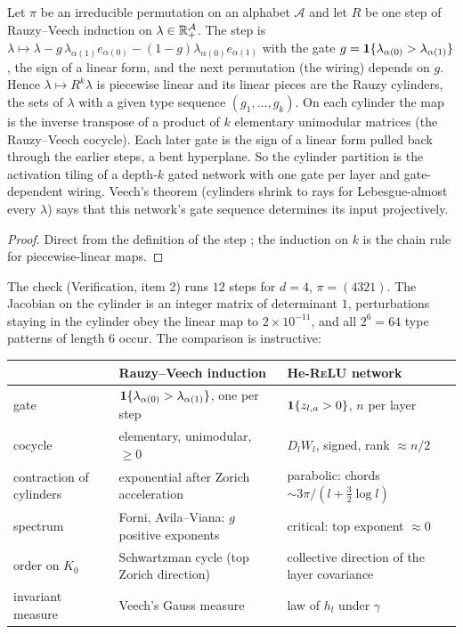 \begin{proposition}\label{prop:rv}
Let $\pi$ be an irreducible permutation on an alphabet $\mathcal A$ and let $R$ be one step of Rauzy--Veech induction on
$\lambda\in\mathbb R^{\mathcal A}_+$. The step is $\lambda\mapsto\lambda-g\,\lambda_{\alpha(1)}e_{\alpha(0)}-(1-g)\lambda_{\alpha(0)}e_{\alpha(1)}$ with the gate
$g=\mathbf 1\{\lambda_{\alpha(0)}>\lambda_{\alpha(1)}\}$, the sign of a linear form, and the next permutation (the wiring) depends on $g$. Hence
$\lambda\mapsto R^k\lambda$ is piecewise linear and its linear pieces are the Rauzy cylinders, the sets of $\lambda$ with a given type
sequence $(g_1,\dots,g_k)$. On each cylinder the map is the inverse transpose of a product of $k$ elementary unimodular matrices (the
Rauzy--Veech cocycle). Each later gate is the sign of a linear form pulled back through the earlier steps, a bent hyperplane. So the
cylinder partition is the activation tiling of a depth-$k$ gated network with one gate per layer and gate-dependent wiring. Veech's
theorem \cite{Veech} (cylinders shrink to rays for Lebesgue-almost every $\lambda$) says that this network's gate sequence determines its
input projectively.
\end{proposition}
\begin{proof}
Direct from the definition of the step \cite[\S12.2]{PT}; the induction on $k$ is the chain rule for piecewise-linear maps.
\end{proof}
The check (Verification, item 2) runs $12$ steps for $d=4$, $\pi=(4321)$. The Jacobian on the cylinder is an integer matrix of
determinant $1$, perturbations staying in the cylinder obey the linear map to $2\times10^{-11}$, and all $2^6=64$ type patterns of length
$6$ occur. The comparison is instructive:
\begin{center}\small
\begin{tabular}{>{\raggedright\arraybackslash}p{4.4cm}>{\raggedright\arraybackslash}p{5.2cm}>{\raggedright\arraybackslash}p{5.2cm}}\toprule
 & Rauzy--Veech induction & He-\textsc{ReLU} network\\\midrule
gate & $\mathbf 1\{\lambda_{\alpha(0)}>\lambda_{\alpha(1)}\}$, one per step & $\mathbf 1\{z_{l,a}>0\}$, $n$ per layer\\
cocycle & elementary, unimodular, $\ge0$ & $D_lW_l$, signed, rank $\approx n/2$\\
contraction of cylinders & exponential after Zorich acceleration & parabolic: chords $\sim3\pi/(l+\tfrac32\log l)$\\
spectrum & Forni, Avila--Viana: $g$ positive exponents & critical: top exponent $\approx0$\\
order on $K_0$ & Schwartzman cycle (top Zorich direction) & collective direction of the layer covariance\\
invariant measure & Veech's Gauss measure & law of $h_l$ under $\gamma$\\\bottomrule
\end{tabular}
\end{center}
